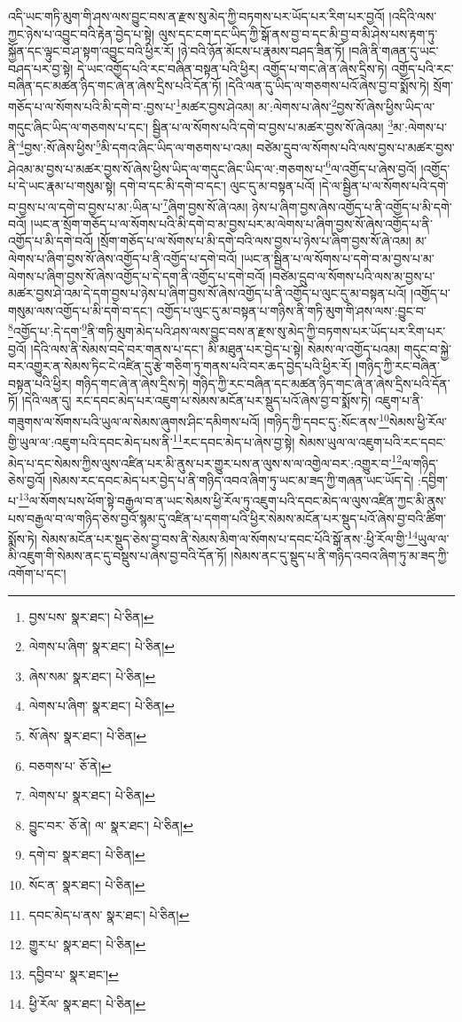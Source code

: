 འདི་ཡང་གཏི་མུག་གི་ཤས་ལས་བྱུང་བས་ན་རྫས་སུ་མེད་ཀྱི་བཏགས་པར་ཡོད་པར་རིག་པར་བྱའོ། །འདིའི་ལས་ཀྱང་ཉེས་པ་འབྱུང་བའི་རྟེན་བྱེད་པ་སྟེ། ལུས་དང་ངག་དང་ཡིད་ཀྱི་སྒོ་ནས་བྱ་བ་དང་མི་བྱ་བ་མི་ཤེས་པས་རྟག་ཏུ་སྐྱོན་དང་ལྟུང་བ་ཤ་སྟག་འབྱུང་བའི་ཕྱིར་རོ། །ཉེ་བའི་ཉོན་མོངས་པ་རྣམས་བཤད་ཟིན་ཏོ། །བཞི་ནི་གཞན་དུ་ཡང་བཤད་པར་བྱ་སྟེ། དེ་ཡང་འགྱོད་པའི་རང་བཞིན་བསྟན་པའི་ཕྱིར། འགྱོད་པ་གང་ཞེ་ན་ཞེས་དྲིས་ཏེ། འགྱོད་པའི་རང་བཞིན་དང་མཚན་ཉིད་གང་ཞེ་ན་ཞེས་དྲིས་པའི་དོན་ཏོ། །དེའི་ལན་དུ་ཡིད་ལ་གཅགས་པའོ་ཞེས་བྱ་བ་སྨོས་ཏེ། སྲོག་གཅོད་པ་ལ་སོགས་པའི་མི་དགེ་བ་:བྱས་པ་\footnote{བྱས་པས་  སྣར་ཐང་།  པེ་ཅིན། }མཚར་བྱས་ཤེའམ། མ་:ལེགས་པ་ཞེས་\footnote{ལེགས་པ་ཞིག་  སྣར་ཐང་།  པེ་ཅིན། }བྱས་སོ་ཞེས་ཕྱིས་ཡིད་ལ་གདུང་ཞིང་ཡིད་ལ་གཅགས་པ་དང་། སྦྱིན་པ་ལ་སོགས་པའི་དགེ་བ་བྱས་པ་མཚར་བྱས་སོ་ཞེའམ། \footnote{ཞེས་སམ་  སྣར་ཐང་།  པེ་ཅིན། }མ་:ལེགས་པ་ནི་\footnote{ལེགས་པ་ཞིག་  སྣར་ཐང་།  པེ་ཅིན། }བྱས་:སོ་ཞེས་ཕྱིས་\footnote{སོ་ཞེས་  སྣར་ཐང་།  པེ་ཅིན། }མི་དགའ་ཞིང་ཡིད་ལ་གཅགས་པ་འམ། བཙེམ་དྲུབ་ལ་སོགས་པའི་ལས་བྱས་པ་མཚར་བྱས་ཤེའམ་མ་བྱས་པ་མཚར་བྱས་སོ་ཞེས་ཕྱིས་ཡིད་ལ་གདུང་ཞིང་ཡིད་ལ་:གཅགས་པ་\footnote{བཅགས་པ་  ཅོ་ནེ། }ལ་འགྱོད་པ་ཞེས་བྱའོ། །འགྱོད་པ་དེ་ཡང་རྣམ་པ་གསུམ་སྟེ། དགེ་བ་དང་མི་དགེ་བ་དང་། ལུང་དུ་མ་བསྟན་པའོ། །དེ་ལ་སྦྱིན་པ་ལ་སོགས་པའི་དགེ་བ་བྱས་པ་ལ་དགེ་བ་བྱས་པ་མ་:ཡིན་པ་\footnote{ལེགས་པ་  སྣར་ཐང་།  པེ་ཅིན། }ཞིག་བྱས་སོ་ཞེ་འམ། ཉེས་པ་ཞིག་བྱས་ཞེས་འགྱོད་པ་ནི་འགྱོད་པ་མི་དགེ་བའོ། །ཡང་ན་སྲོག་གཅོད་པ་ལ་སོགས་པའི་མི་དགེ་བ་མ་བྱས་པར་མ་ལེགས་པ་ཞིག་བྱས་སོ་ཞེས་འགྱོད་པ་ནི་འགྱོད་པ་མི་དགེ་བའོ། །སྲོག་གཅོད་པ་ལ་སོགས་པ་མི་དགེ་བའི་ལས་བྱས་པ་ཉེས་པ་ཞིག་བྱས་སོ་ཞེ་འམ། མ་ལེགས་པ་ཞིག་བྱས་སོ་ཞེས་འགྱོད་པ་ནི་འགྱོད་པ་དགེ་བའོ། །ཡང་ན་སྦྱིན་པ་ལ་སོགས་པ་དགེ་བ་མ་བྱས་པ་མ་ལེགས་པ་ཞིག་བྱས་སོ་ཞེས་འགྱོད་པ་དེ་དག་ནི་འགྱོད་པ་དགེ་བའོ། །བཙེམ་དྲུབ་ལ་སོགས་པའི་ལས་མ་བྱས་པ་མཚར་བྱས་ཤེ་འམ་དེ་དག་བྱས་པ་ཉེས་པ་ཞིག་བྱས་སོ་ཞེས་འགྱོད་པ་ནི་འགྱོད་པ་ལུང་དུ་མ་བསྟན་པའོ། །འགྱོད་པ་གསུམ་ལས་འགྱོད་པ་མི་དགེ་བ་དང་། འགྱོད་པ་ལུང་དུ་མ་བསྟན་པ་གཉིས་ནི་གཏི་མུག་གི་ཤས་ལས་:བྱུང་བ་\footnote{བྱུང་བར་  ཅོ་ནེ། ལ་  སྣར་ཐང་།  པེ་ཅིན། }འགྱོད་པ་:དེ་དག་\footnote{དགེ་བ་  སྣར་ཐང་།  པེ་ཅིན། }ནི་གཏི་མུག་མེད་པའི་ཤས་ལས་བྱུང་བས་ན་རྫས་སུ་མེད་ཀྱི་བཏགས་པར་ཡོད་པར་རིག་པར་བྱའོ། །དེའི་ལས་ནི་སེམས་བདེ་བར་གནས་པ་དང་། མི་མཐུན་པར་བྱེད་པ་སྟེ། སེམས་ལ་འགྱོད་པའམ། གདུང་བ་སྐྱེ་བར་འགྱུར་ན་སེམས་ཏིང་ངེ་འཛིན་དུ་རྩེ་གཅིག་ཏུ་གནས་པའི་བར་ཆད་བྱེད་པའི་ཕྱིར་རོ། །གཉིད་ཀྱི་རང་བཞིན་བསྟན་པའི་ཕྱིར། གཉིད་གང་ཞེ་ན་ཞེས་དྲིས་ཏེ། གཉིད་ཀྱི་རང་བཞིན་དང་མཚན་ཉིད་གང་ཞེ་ན་ཞེས་དྲིས་པའི་དོན་ཏོ། །དེའི་ལན་དུ། རང་དབང་མེད་པར་འཇུག་པ་སེམས་མངོན་པར་སྡུད་པའོ་ཞེས་བྱ་བ་སྨོས་ཏེ། འཇུག་པ་ནི་གཟུགས་ལ་སོགས་པའི་ཡུལ་ལ་སེམས་ཞུགས་ཤིང་དམིགས་པའོ། །གཉིད་ཀྱི་དབང་དུ་:སོང་ནས་\footnote{སོང་ན་  སྣར་ཐང་།  པེ་ཅིན། }སེམས་ཕྱི་རོལ་གྱི་ཡུལ་ལ་:འཇུག་པའི་དབང་མེད་པས་ནི་\footnote{དབང་མེད་པ་ནས་  སྣར་ཐང་།  པེ་ཅིན། }རང་དབང་མེད་པ་ཞེས་བྱ་སྟེ། སེམས་ཡུལ་ལ་འཇུག་པའི་རང་དབང་མེད་པ་དང་སེམས་ཀྱིས་ལུས་འཛིན་པར་མི་ནུས་པར་གྱུར་པས་ན་ལུས་ས་ལ་འགྱེལ་བར་:འགྱུར་བ་\footnote{གྱུར་པ་  སྣར་ཐང་།  པེ་ཅིན། }ལ་གཉིད་ཅེས་བྱའོ། །སེམས་རང་དབང་མེད་པར་བྱེད་པ་ནི་གཉིད་འབའ་ཞིག་ཏུ་ཡང་མ་ཟད་ཀྱི་གཞན་ཡང་ཡོད་དེ། :དབྱིག་པ་\footnote{དབྱིབ་པ་  སྣར་ཐང་། }ལ་སོགས་པས་ཕོག་སྟེ་བརྒྱལ་བ་ན་ཡང་སེམས་ཕྱི་རོལ་ཏུ་འཇུག་པའི་དབང་མེད་ལ་ལུས་འཛིན་ཀྱང་མི་ནུས་པས་བརྒྱལ་བ་ལ་གཉིད་ཅེས་བྱའོ་སྙམ་དུ་འཛིན་པ་དགག་པའི་ཕྱིར་སེམས་མངོན་པར་སྡུད་པའོ་ཞེས་བྱ་བའི་ཚིག་སྨོས་ཏེ། སེམས་མངོན་པར་སྡུད་ཅེས་བྱ་བས་ནི་སེམས་མིག་ལ་སོགས་པ་དབང་པོའི་སྒོ་ནས་:ཕྱི་རོལ་གྱི་\footnote{ཕྱི་རོལ་  སྣར་ཐང་།  པེ་ཅིན། }ཡུལ་ལ་མི་འཇུག་གི་སེམས་ནང་དུ་བསྡུས་པ་ཞེས་བྱ་བའི་དོན་ཏོ། །སེམས་ནང་དུ་སྡུད་པ་ནི་གཉིད་འབའ་ཞིག་ཏུ་མ་ཟད་ཀྱི་འགོག་པ་དང་། 